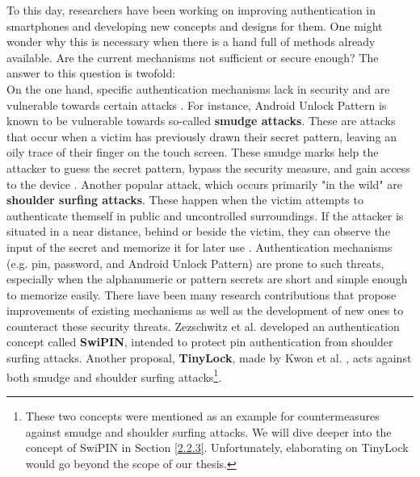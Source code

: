 To this day, researchers have been working on improving authentication in smartphones and developing new concepts and designs for them. One might wonder why this is necessary when there is a hand full of methods already available. Are the current mechanisms not sufficient or secure enough? The answer to this question is twofold:\\

On the one hand, specific authentication mechanisms lack in security and are vulnerable towards certain attacks \cite{Schloeglhofer}. For instance, Android Unlock Pattern is known to be vulnerable towards so-called \textbf{smudge attacks}. These are attacks that occur when a victim has previously drawn their secret pattern, leaving an oily trace of their finger on the touch screen. These smudge marks help the attacker to guess the secret pattern, bypass the security measure, and gain access to the device \cite{ediss20251}. Another popular attack, which occurs primarily "in the wild" are \textbf{shoulder surfing attacks}. These happen when the victim attempts to authenticate themself in public and uncontrolled surroundings. If the attacker is situated in a near distance, behind or beside the victim, they can observe the input of the secret and memorize it for later use \cite{ediss20251}. Authentication mechanisms (e.g. pin, password, and Android Unlock Pattern) are prone to such threats, especially when the alphanumeric or pattern secrets are short and simple enough to memorize easily. There have been many research contributions that propose improvements of existing mechanisms as well as the development of new ones to counteract these security threats. Zezschwitz et al. \cite{vonZezschwitz:2015:SFS:2702123.2702212} developed an authentication concept called \textbf{SwiPIN}, intended to protect pin authentication from shoulder surfing attacks. Another proposal, \textbf{TinyLock}, made by Kwon et al. \cite{kwon}, acts against both smudge and shoulder surfing attacks\footnote{These two concepts were mentioned as an example for countermeasures against smudge and shoulder surfing attacks. We will dive deeper into the concept of SwiPIN \cite{Swipin} in Section \ref{2.2.3}. Unfortunately, elaborating on TinyLock \cite{kwon} would go beyond the scope of our thesis.}.\\


